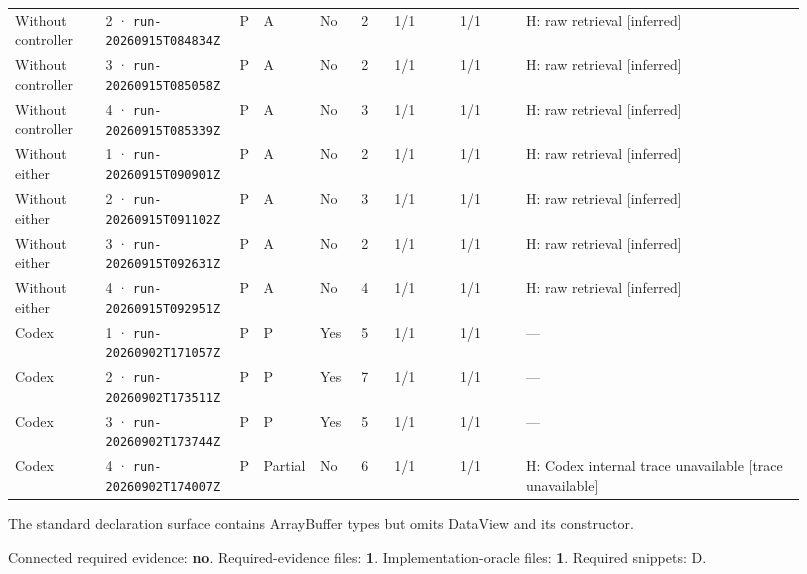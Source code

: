 \begin{landscape}
\begin{longtable}{@{}L{0.11\linewidth}L{0.16\linewidth}*{2}{L{0.022\linewidth}}L{0.05\linewidth}L{0.045\linewidth}L{0.08\linewidth}L{0.085\linewidth}L{0.346\linewidth}@{}}
Without controller & 2 · \texttt{run-20260915\allowbreak T084834Z} & P & A & No & 2 & 1/1 & 1/1 & H: raw retrieval [inferred] \\
Without controller & 3 · \texttt{run-20260915\allowbreak T085058Z} & P & A & No & 2 & 1/1 & 1/1 & H: raw retrieval [inferred] \\
Without controller & 4 · \texttt{run-20260915\allowbreak T085339Z} & P & A & No & 3 & 1/1 & 1/1 & H: raw retrieval [inferred] \\
Without either & 1 · \texttt{run-20260915\allowbreak T090901Z} & P & A & No & 2 & 1/1 & 1/1 & H: raw retrieval [inferred] \\
Without either & 2 · \texttt{run-20260915\allowbreak T091102Z} & P & A & No & 3 & 1/1 & 1/1 & H: raw retrieval [inferred] \\
Without either & 3 · \texttt{run-20260915\allowbreak T092631Z} & P & A & No & 2 & 1/1 & 1/1 & H: raw retrieval [inferred] \\
Without either & 4 · \texttt{run-20260915\allowbreak T092951Z} & P & A & No & 4 & 1/1 & 1/1 & H: raw retrieval [inferred] \\
Codex & 1 · \texttt{run-20260902\allowbreak T171057Z} & P & P & Yes & 5 & 1/1 & 1/1 & --- \\
Codex & 2 · \texttt{run-20260902\allowbreak T173511Z} & P & P & Yes & 7 & 1/1 & 1/1 & --- \\
Codex & 3 · \texttt{run-20260902\allowbreak T173744Z} & P & P & Yes & 5 & 1/1 & 1/1 & --- \\
Codex & 4 · \texttt{run-20260902\allowbreak T174007Z} & P & Partial & No & 6 & 1/1 & 1/1 & H: Codex internal trace unavailable [trace unavailable] \\
\end{longtable}
\endgroup
\end{landscape}

\label{sec:microsoft-typescript-2953}

The standard declaration surface contains ArrayBuffer types but omits DataView and its constructor.

Connected required evidence: \textbf{no}. Required-evidence files: \textbf{1}. Implementation-oracle files: \textbf{1}. Required snippets: D.

